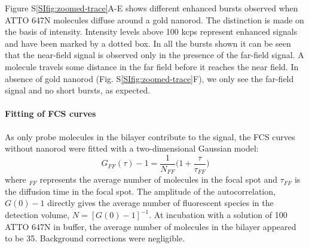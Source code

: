 Figure S\ref{SIfig:zoomed-trace}A-E shows different enhanced bursts observed when ATTO 647N molecules diffuse around a gold nanorod.
The distinction is made on the basis of intensity.
Intensity levels above 100 kcps represent enhanced signals and have been marked by a dotted box.
In all the bursts shown it can be seen that the near-field signal is observed only in the presence of the far-field signal.
A molecule travels some distance in the far field before it reaches the near field.
In absence of gold nanorod (Fig. S\ref{SIfig:zoomed-trace}F), we only see the far-field signal and no short bursts, as expected.
\paragraph*{Fitting of FCS curves}
As only probe molecules in the bilayer contribute to the signal, the FCS curves without nanorod were fitted with a two-dimensional Gaussian model:
\begin{equation}
  G_{FF}(\tau)-1 = \frac{1}{N_{FF}}\Bigg(1+\frac{\tau}{\tau_{FF}}\Bigg)
  \label{eq:2Dgauss}
\end{equation}
where $_{FF}$ represents the average number of molecules in the focal spot and $\tau_{FF}$ is the diffusion time in the focal spot.
The amplitude of the autocorrelation, $G(0)-1$ directly gives the average number of fluorescent species in the detection volume, $N=[G(0)-1]^{-1}$.
At incubation with a solution of \SI{100}{\nM} ATTO 647N in buffer, the average number of molecules in the bilayer appeared to be 35.
Background corrections were negligible.


